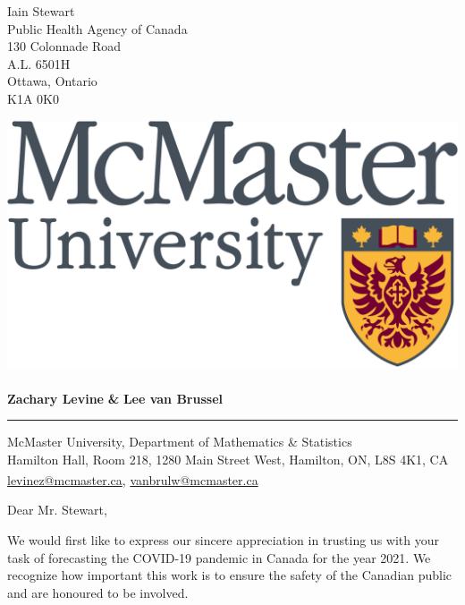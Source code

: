\documentclass[12pt]{letter}
\begin{document}
\date{December 4, 2020}

\signature{Zachary Levine \& Lee van Brussel}           %
\longindentation=0pt                       %
\let\raggedleft\raggedright                %
 
\begin{letter}{
Iain Stewart\\
Public Health Agency of Canada\\
130 Colonnade Road\\
A.L. 6501H\\
Ottawa, Ontario\\
K1A 0K0}

\includegraphics[scale=0.08]{coverletter/mac.png}
\begin{center}
{\large\bf {Zachary Levine}}\textsuperscript{\textdagger} {\large\bf{\&}} {\large\bf{Lee van Brussel}}\textsuperscript{\textdagger\textdagger}
\end{center}
\medskip\hrule height 0.8pt
\begin{center}
{McMaster University, Department of Mathematics \& Statistics\\ 
Hamilton Hall, Room 218, 1280 Main Street West, Hamilton, ON, L8S 4K1, CA \\  
{\url{levinez@mcmaster.ca}}\textsuperscript{\textdagger}, {\url{vanbrulw@mcmaster.ca}}\textsuperscript{\textdagger\textdagger}}
\end{center}  %

\opening{Dear Mr. Stewart,} 
We would first like to express our sincere appreciation in trusting us with your task of forecasting the COVID-19 pandemic in Canada for the year 2021. We recognize how important this work is to ensure the safety of the Canadian public and are honoured to be involved.


\end{letter}
\end{document}
